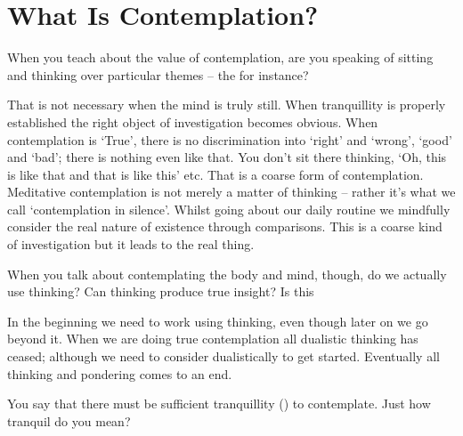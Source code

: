 %
%
%


\chapter{What Is Contemplation?}

When you teach about the value of contemplation, are you speaking of sitting and thinking over particular themes -- the  for instance?

\noindent{}
That is not necessary when the mind is truly still. When tranquillity is properly established the right object of investigation becomes obvious. When contemplation is `True', there is no discrimination into `right' and `wrong', `good' and `bad'; there is nothing even like that. You don't sit there thinking, `Oh, this is like that and that is like this' etc. That is a coarse form of contemplation. Meditative contemplation is not merely a matter of thinking -- rather it's what we call `contemplation in silence'. Whilst going about our daily routine we mindfully consider the real nature of existence through comparisons. This is a coarse kind of investigation but it leads to the real thing.

When you talk about contemplating the body and mind, though, do we actually use thinking? Can thinking produce true insight? Is this 

In the beginning we need to work using thinking, even though later on we go beyond it. When we are doing true contemplation all dualistic thinking has ceased; although we need to consider dualistically to get started. Eventually all thinking and pondering comes to an end.

You say that there must be sufficient tranquillity () to con\-tem\-plate. Just how tranquil do you mean?

